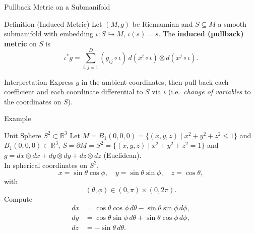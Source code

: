 \begin{frame}{Pullback Metric on a Submanifold}
\begin{block}{Definition (Induced Metric)}
Let $(M,g)$ be Riemannian and $S\subseteq M$ a smooth submanifold with embedding
$\iota:S\hookrightarrow M$, $\iota(s)=s$.
The \textbf{induced (pullback) metric} on $S$ is
\[
\iota^*g=\sum_{i,j=1}^{D} (g_{ij}\circ \iota)\, d(x^i\circ \iota)\otimes d(x^j\circ \iota).
\]
\end{block}
\begin{block}{Interpretation}
Express $g$ in the ambient coordinates, then pull back each coefficient and
each coordinate differential to $S$ via $\iota$ (i.e.\ \textit{change of variables} to the coordinates on $S$).
\end{block}
\end{frame}

\begin{frame}{Example}
\vspace{-0.2cm}
\begin{block}{Unit Sphere $S^2\subset\mathbb{R}^3$}
Let $M=B_1(0,0,0)=\{(x,y,z)\mid x^2+y^2+z^2\leq1\}$ and $B_1(0,0,0) \subset\mathbb{R}^3$, $S=\partial M=S^2=\{(x,y,z)\mid x^2+y^2+z^2=1\}$ and
$g=dx\otimes dx+dy\otimes dy+dz\otimes dz$ (Euclidean).\\

In spherical coordinates on $S^2$,
\vspace{-0.2cm}
\[
x=\sin\theta\cos\phi,\quad y=\sin\theta\sin\phi,\quad z=\cos\theta,
\]
with
\vspace{-0.2cm}
\[
(\theta,\phi)\in(0,\pi)\times(0,2\pi).
\]
Compute
\vspace{-0.2cm}
\[
\begin{aligned}
dx&=\cos\theta\cos\phi\,d\theta-\sin\theta\sin\phi\,d\phi,\\
dy&=\cos\theta\sin\phi\,d\theta+\sin\theta\cos\phi\,d\phi,\\
dz&=-\sin\theta\,d\theta.
\end{aligned}
\]
\vspace{-0.2cm}
\end{block}
\end{frame}


